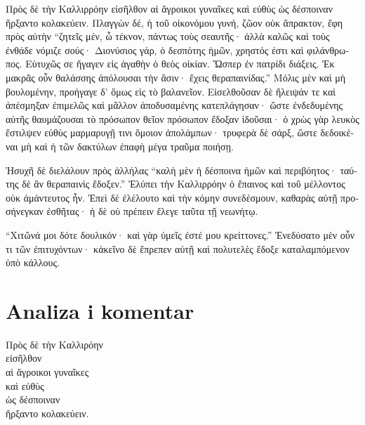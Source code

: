 {\large

\begin{greek}

\noindent Πρὸς δὲ τὴν Καλλιρρόην εἰσῆλθον αἱ ἄγροικοι γυναῖκες καὶ εὐθὺς ὡς δέσποιναν ἤρξαντο κολακεύειν. Πλαγγὼν δέ, ἡ τοῦ οἰκονόμου γυνή, ζῶον οὐκ ἄπρακτον, ἔφη πρὸς αὐτὴν ``ζητεῖς μέν, ὦ τέκνον, πάντως τοὺς σεαυτῆς· ἀλλὰ καλῶς καὶ τοὺς ἐνθάδε νόμιζε σούς· Διονύσιος γάρ, ὁ δεσπότης ἡμῶν, χρηστός ἐστι καὶ φιλάνθρωπος. Εὐτυχῶς σε ἤγαγεν εἰς ἀγαθὴν ὁ θεὸς οἰκίαν. Ὥσπερ ἐν πατρίδι διάξεις. Ἐκ μακρᾶς οὖν θαλάσσης ἀπόλουσαι τὴν ἄσιν· ἔχεις θεραπαινίδας.'' Μόλις μὲν καὶ μὴ βουλομένην, προήγαγε δ' ὅμως εἰς τὸ βαλανεῖον. Εἰσελθοῦσαν δὲ ἤλειψάν τε καὶ ἀπέσμηξαν ἐπιμελῶς καὶ μᾶλλον ἀποδυσαμένης κατεπλάγησαν· ὥστε ἐνδεδυμένης αὐτῆς θαυμάζουσαι τὸ πρόσωπον θεῖον πρόσωπον ἔδοξαν ἰδοῦσαι· ὁ χρὼς γὰρ λευκὸς ἔστιλψεν εὐθὺς μαρμαρυγῇ τινι ὅμοιον ἀπολάμπων· τρυφερὰ δὲ σάρξ, ὥστε δεδοικέναι μὴ καὶ ἡ τῶν δακτύλων ἐπαφὴ μέγα τραῦμα ποιήσῃ.

\noindent Ἡσυχῆ δὲ διελάλουν πρὸς ἀλλήλας ``καλὴ μὲν ἡ δέσποινα ἡμῶν καὶ περιβόητος· ταύτης δὲ ἂν θεραπαινὶς ἔδοξεν.'' Ἐλύπει τὴν Καλλιρρόην ὁ ἔπαινος καὶ τοῦ μέλλοντος οὐκ ἀμάντευτος ἦν. Ἐπεὶ δὲ ἐλέλουτο καὶ τὴν κόμην συνεδέσμουν, καθαρὰς αὐτῇ προσήνεγκαν ἐσθῆτας· ἡ δὲ οὐ πρέπειν ἔλεγε ταῦτα τῇ νεωνήτῳ.

\noindent ``Χιτῶνά μοι δότε δουλικόν· καὶ γὰρ ὑμεῖς ἐστέ μου κρείττονες.'' Ἐνεδύσατο μὲν οὖν τι τῶν ἐπιτυχόντων· κἀκεῖνο δὲ ἔπρεπεν αὐτῇ καὶ πολυτελὲς ἔδοξε καταλαμπόμενον ὑπὸ κάλλους.


\end{greek}

}


\section*{Analiza i komentar}


{\large
\begin{greek}
\noindent Πρὸς δὲ τὴν Καλλιρόην \\
εἰσῆλθον \\
αἱ ἄγροικοι γυναῖκες \\
καὶ εὐθὺς \\
\tabto{2em} ὡς δέσποιναν \\
ἤρξαντο κολακεύειν.\\

\end{greek}
}

